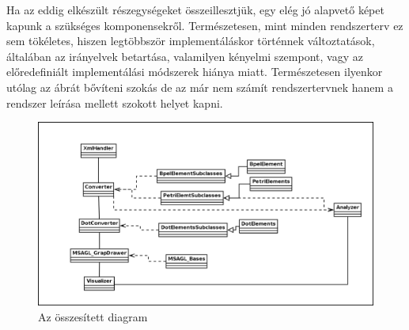 Ha az eddig elkészült részegységeket összeillesztjük, egy elég jó alapvető képet kapunk a szükséges komponensekről. Természetesen, mint minden rendszerterv ez sem tökéletes, hiszen legtöbbször implementáláskor történnek változtatások, általában az irányelvek betartása, valamilyen kényelmi szempont, vagy az előredefiniált implementálási módszerek hiánya miatt. Természetesen ilyenkor utólag az ábrát bővíteni szokás de az már nem számít rendszertervnek hanem a rendszer leírása mellett szokott helyet kapni.
\begin{landscape}
\begin{figure}[h!]
\centering
\includegraphics[scale=0.5]{images/sumdia.png}
\caption{Az összesített diagram}
\label{fig:sysdes}
\end{figure}
\end{landscape}
